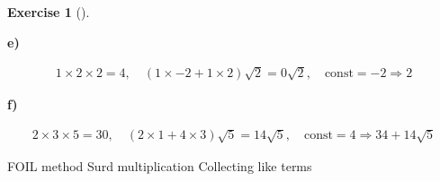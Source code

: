 \documentclass[
  letterpaper,
  DIV=11,
  numbers=noendperiod]{scrreprt}
\theoremstyle{definition}
\newtheorem{exercise}{Exercise}[chapter]
\theoremstyle{remark}
\begin{document}
\begin{exercise}[]
\begin{tcolorbox}
\textbf{e)}

\[
\begin{aligned}
1\times 2\times 2=4,\quad(1\times -2+1\times 2)\sqrt{2}=0\sqrt{2},\quad\text{const}=-2 \Rightarrow 2
\end{aligned}
\]

\textbf{f)}

\[
\begin{aligned}
2\times 3\times 5=30,\quad(2\times 1+4\times 3)\sqrt{5}=14\sqrt{5},\quad\text{const}=4 \Rightarrow 34 + 14\sqrt{5}
\end{aligned}
\]

\end{tcolorbox}

{FOIL method} {Surd multiplication} {Collecting like terms}

\end{exercise}
\end{document}
